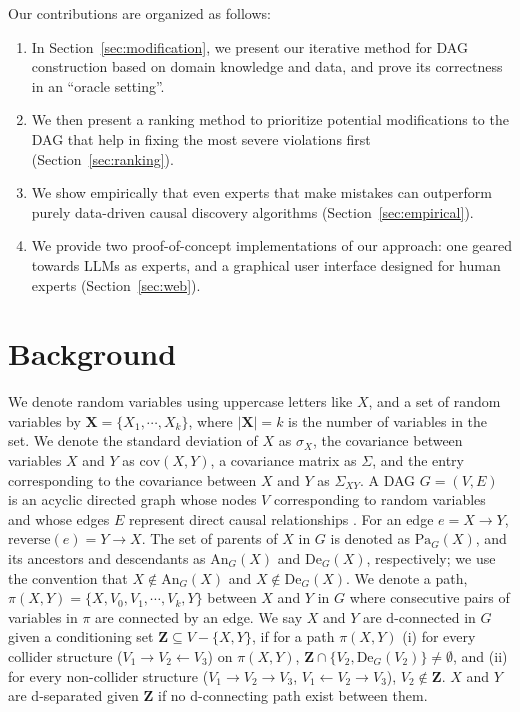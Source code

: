 \documentclass[accepted]{uai2025} %
\begin{document}
Our contributions are organized as follows:

\begin{enumerate}
    \item In Section~\ref{sec:modification}, we present our iterative method for DAG construction
	based on domain knowledge and data, and prove its correctness in an ``oracle setting''.
    \item We then present a ranking method to prioritize potential modifications to the DAG that 
    	    help in fixing the most severe violations first (Section~\ref{sec:ranking}).
    \item We show empirically that even experts that make mistakes can outperform purely 
	data-driven
	causal discovery algorithms (Section~\ref{sec:empirical}).
    \item We provide two proof-of-concept implementations of our approach: one geared towards
	LLMs as experts, and a graphical user interface designed 
	for human experts (Section~\ref{sec:web}).
\end{enumerate}

\section{Background}
\label{sec:background}
We denote random variables using uppercase letters like $X$, and a set of
random variables by $ \bm{X} = \{X_1, \cdots, X_k\} $, where $ \rvert \bm{X}
\rvert = k $ is the number of variables in the set. We denote the standard
deviation of $ X $ as $ \sigma_X $, the covariance between variables $ X $ and
$ Y $ as $ \mathrm{cov}(X, Y) $, a covariance matrix as $ \Sigma $, and the
entry corresponding to the covariance between $ X $ and $ Y $ as $ \Sigma_{XY}
$. A DAG $ G =
(V, E) $ is an acyclic directed graph whose nodes $ V $ corresponding to random
variables and whose edges $ E $ represent direct causal relationships
\cite{Pearl2009}. For an edge $e=X \to Y$, $\textrm{reverse}(e)=Y \to X$. The
set of parents of $ X $ in $ G $ is denoted as $ \textrm{Pa}_G(X) $, and its
ancestors and descendants as $ \textrm{An}_G(X) $ and $ \textrm{De}_G(X) $,
respectively; we use the convention that $X \notin \textrm{An}_G(X)$ and $X
\notin \textrm{De}_G(X)$. We denote a path, $ \pi(X, Y) = \{ X, V_0, V_1,
\cdots, V_k, Y \} $ between $ X $ and $ Y $ in $ G $ where consecutive pairs of
variables in $ \pi $ are connected by an edge. We say $ X $ and $ Y $ are
d-connected in $ G $ given a conditioning set $ \bm{Z} \subseteq V - \{X, Y\}
$, if for a path $ \pi(X, Y) $ (i) for every collider structure ($ V_1
\rightarrow V_2 \leftarrow V_3 $) on $ \pi(X, Y) $, $ \bm{Z} \cap \{ V_2,
\textrm{De}_G(V_2) \} \ne \emptyset $, and (ii) for every non-collider
structure ($ V_1 \rightarrow V_2 \rightarrow V_3 $, $ V_1 \leftarrow V_2
\rightarrow V_3 $), $ V_2 \not \in \bm{Z} $. $ X $ and $ Y $ are d-separated
given $ \bm{Z} $ if no d-connecting path exist between them.
\end{document}
